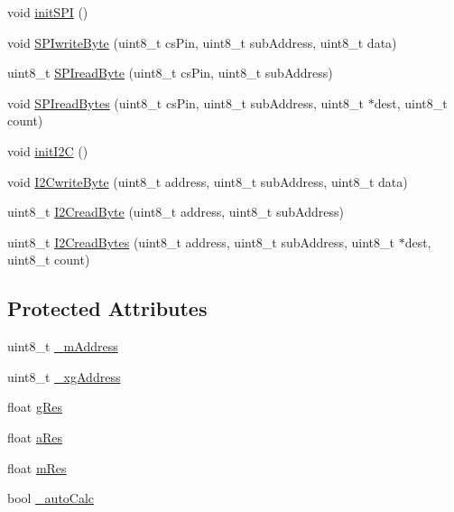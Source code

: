 \begin{DoxyCompactItemize}
void \hyperlink{class_l_s_m9_d_s1_a4286d5803ab028c657e007ae99acc60a}{init\+S\+PI} ()
\item 
void \hyperlink{class_l_s_m9_d_s1_a83321c9d6ec50f6b9944907d2be482cd}{S\+P\+Iwrite\+Byte} (uint8\+\_\+t cs\+Pin, uint8\+\_\+t sub\+Address, uint8\+\_\+t data)
\item 
uint8\+\_\+t \hyperlink{class_l_s_m9_d_s1_a6f0f50bb5e9b702d5a19c7441a3f9d8b}{S\+P\+Iread\+Byte} (uint8\+\_\+t cs\+Pin, uint8\+\_\+t sub\+Address)
\item 
void \hyperlink{class_l_s_m9_d_s1_a26c0f164454eba84e6486033b7061d11}{S\+P\+Iread\+Bytes} (uint8\+\_\+t cs\+Pin, uint8\+\_\+t sub\+Address, uint8\+\_\+t $\ast$dest, uint8\+\_\+t count)
\item 
void \hyperlink{class_l_s_m9_d_s1_ae60332c2836bd3f19846b7a44c015ddd}{init\+I2C} ()
\item 
void \hyperlink{class_l_s_m9_d_s1_a8e66108a002cc15ec4c0db0a608d20c6}{I2\+Cwrite\+Byte} (uint8\+\_\+t address, uint8\+\_\+t sub\+Address, uint8\+\_\+t data)
\item 
uint8\+\_\+t \hyperlink{class_l_s_m9_d_s1_a7fc046d4b335494331905fdeb5c81c9e}{I2\+Cread\+Byte} (uint8\+\_\+t address, uint8\+\_\+t sub\+Address)
\item 
uint8\+\_\+t \hyperlink{class_l_s_m9_d_s1_adfc9a22290daddd7787e8023fa8f12cc}{I2\+Cread\+Bytes} (uint8\+\_\+t address, uint8\+\_\+t sub\+Address, uint8\+\_\+t $\ast$dest, uint8\+\_\+t count)
\end{DoxyCompactItemize}
\subsection*{Protected Attributes}
\begin{DoxyCompactItemize}
\item 
uint8\+\_\+t \hyperlink{class_l_s_m9_d_s1_a7141933a2ccde95976e4eecd598ecb17}{\+\_\+m\+Address}
\item 
uint8\+\_\+t \hyperlink{class_l_s_m9_d_s1_ac78b7fab605570a16433a4636f91451e}{\+\_\+xg\+Address}
\item 
float \hyperlink{class_l_s_m9_d_s1_a2d8654ebb35177088a67e67a944bd998}{g\+Res}
\item 
float \hyperlink{class_l_s_m9_d_s1_acdc1f9b300b3c349e17dd21c9bb37c40}{a\+Res}
\item 
float \hyperlink{class_l_s_m9_d_s1_aac7ae43adf399e8052464b966aec8472}{m\+Res}
\item 
bool \hyperlink{class_l_s_m9_d_s1_a8460d00ea0bb496c5d49190a34e54588}{\+\_\+auto\+Calc}
\end{DoxyCompactItemize}


